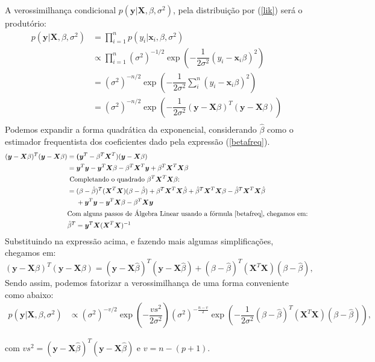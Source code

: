 \documentclass[12pt,letterpaper]{article}
\newcommand{\bd}[1]{\boldsymbol{#1}}
\begin{document}
	A verossimilhança condicional $p(\bd y|\bd X,\beta,\sigma^2)$, pela distribuição por (\ref{lik}) será o produtório:
	\begin{align*}
		p(\bd y|\bd X,\beta,\sigma^2)&=\prod_{i=1}^{n}p(y_i|\bd x_i,\beta,\sigma^2)\\
		&\propto \prod_{i=1}^{n}(\sigma^2)^{-1/2}\exp\left(-\dfrac{1}{2\sigma^2}(y_i-\bd x_i\beta)^2\right)\\
		&=(\sigma^2)^{-n/2}\exp\left(-\dfrac{1}{2\sigma^2}\sum_i^n(y_i-\bd x_i\beta)^2\right)\\
		&=(\sigma^2)^{-n/2}\exp\left(-\dfrac{1}{2\sigma^2}(\bd y-\bd X\beta)^T(\bd y-\bd X\beta)\right)\\
	\end{align*}
	Podemos expandir a forma quadrática da exponencial, considerando $\hat\beta$ como o estimador frequentista dos coeficientes dado pela expressão (\ref{betafreq}).
	\begin{align*}(\bd y-\bd X\beta)^T(\bd y-\bd X\beta)&=\bd (\bd y^T-\beta^T\bd X^T)(\bd y-\bd X\beta)\\
		&=\bd y^T\bd y-\bd y^T\bd X\beta-\beta^T\bd X^T\bd y+\beta^T\bd X^T\bd X\beta\\
		&\text{ Completando o quadrado $\beta^T\bd X^T\bd X\beta$:}\\
		&=(\beta-\hat\beta)^T(\bd X^T\bd X)(\beta-\hat\beta)+\beta^T\bd X^T\bd X\hat\beta+\hat\beta^T\bd X^T\bd X\beta-\hat\beta^T\bd X^T\bd X\hat\beta\\
		&~~~~+\bd y^T\bd y-\bd y^T\bd X\beta-\beta^T\bd X\bd y\\
		&\text{Com alguns passos de Álgebra Linear usando a fórmula \ref{betafreq}, chegamos em:}\\
		&\hat\beta^T=\bd y^T\bd X(\bd X^T\bd X)^{-1}\end{align*}
		Substituindo na expressão acima, e fazendo mais algumas simplificações, chegamos em:
		$$(\bd y-\bd X\beta)^T(\bd y-\bd X\beta)=(\bd y-\bd X\hat\beta)^T(\bd y-\bd X\hat\beta)+(\beta-\hat\beta)^T(\bd X^T\bd X)(\beta-\hat\beta),$$ 
	Sendo assim, podemos fatorizar a verossimilhança de uma forma conveniente como abaixo:
	\begin{align}
		p(\bd y|\bd X,\beta,\sigma^2)&\propto (\sigma^2)^{-v/2}\exp\left(-\dfrac{vs^2}{2\sigma^2}\right)(\sigma^2)^{-\frac{n-v}{2}}\exp\left(-\dfrac{1}{2\sigma^2}(\beta-\hat\beta)^T(\bd X^T\bd X)(\beta-\hat\beta)\right),\label{lik2}
	\end{align}
	
	com $vs^2=(\bd y-\bd X\hat\beta)^T(\bd y-\bd X\hat\beta)$ e $v=n-(p+1)$.
	
\end{document}
